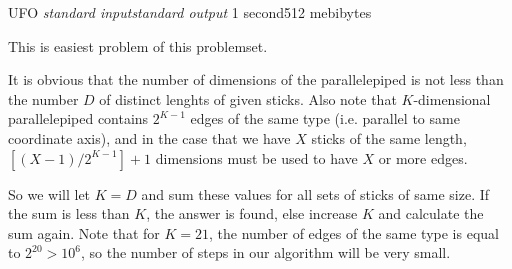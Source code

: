 \begin{problem}{UFO}
{\textsl{standard input}}{\textsl{standard output}}
{1 second}{512 mebibytes}{}

This is easiest problem of this problemset.

It is obvious that the number of dimensions of the parallelepiped
is not less than the number $D$ of distinct lenghts of given sticks.
Also note that $K$-dimensional parallelepiped contains $2^{K-1}$ edges
of the same type (i.e. parallel to same coordinate axis),
and in the case that we have $X$ sticks of the same length,
$[(X-1)/2^{K-1}]+1$ dimensions must be used to have $X$ or more edges.

So we will let $K=D$ and sum these values for all sets of sticks of same size.
If the sum is less than $K$, the answer is found, else increase $K$
and calculate the sum again.
Note that for $K=21$, the number of edges of the same type is equal to
$2^{20} > 10^6$, so the number of steps in our algorithm will be very small.

\end{problem}
